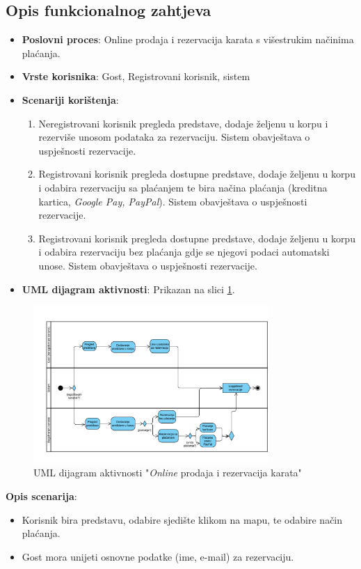 \subsection{Opis funkcionalnog zahtjeva}  
\begin{itemize}  
    \item \textbf{Poslovni proces}: Online prodaja i rezervacija karata s višestrukim načinima plaćanja. 
    \item \textbf{Vrste korisnika}: Gost, Registrovani korisnik, sistem  
    \item \textbf{Scenariji korištenja}:  
        \begin{enumerate}  
            \item Neregistrovani korisnik pregleda predstave, dodaje željenu u korpu i rezerviše unosom podataka za rezervaciju. Sistem obavještava o uspješnosti rezervacije.  
            \item Registrovani korisnik pregleda dostupne predstave, dodaje željenu u korpu i odabira rezervaciju sa plaćanjem te bira načina plaćanja (kreditna kartica, \textit{Google Pay, PayPal}). Sistem obavještava o uspješnosti rezervacije.  
            \item Registrovani korisnik pregleda dostupne predstave, dodaje željenu u korpu i odabira rezervaciju bez plaćanja gdje se njegovi podaci automatski unose. Sistem obavještava o uspješnosti rezervacije.  
        \end{enumerate}  
    \item \textbf{UML dijagram aktivnosti}: Prikazan na slici \ref{fig:fz2}.  
\end{itemize}  
\begin{figure}[H]
    \centering
    \includegraphics[width=0.8\textwidth]{Slike/Fz2.png}
    \caption{UML dijagram aktivnosti "\textit{Online} prodaja i rezervacija karata"}
    \label{fig:fz2}
\end{figure}
\sloppy  
    \textbf{Opis scenarija}:  
        \begin{itemize}  
            \item Korisnik bira predstavu, odabire sjedište klikom na mapu, te odabire način plaćanja.  
            \item Gost mora unijeti osnovne podatke (ime, e-mail) za rezervaciju.  
        \end{itemize}  
